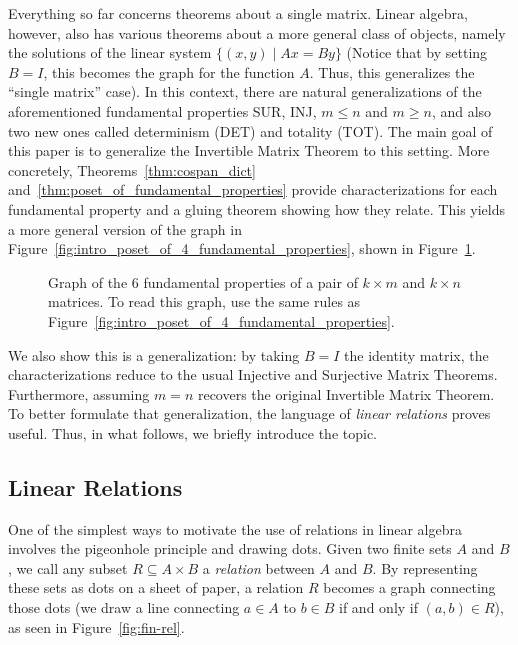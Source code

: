 \documentclass[manyauthors]{fundam}
\def\by{{\times}}
\begin{document}
Everything so far concerns theorems about a single matrix.
Linear algebra, however, also has various theorems about a more general class of objects, namely the solutions of the linear system $\{(x,y) \mid Ax = By\}$
(Notice that by setting $B = I$, this becomes the graph for the function $A$. Thus, this generalizes the ``single matrix'' case).
In this context, there are natural generalizations of the aforementioned fundamental properties SUR, INJ, $m \leq n$ and $m \geq n$, and also two new ones called determinism (DET) and totality (TOT).
The main goal of this paper is to generalize the Invertible Matrix Theorem to this setting.
More concretely, Theorems~\ref{thm:cospan_dict} and~\ref{thm:poset_of_fundamental_properties} provide characterizations for each fundamental property and a gluing theorem showing how they relate.
This yields a more general version of the graph in Figure~\ref{fig:intro_poset_of_4_fundamental_properties}, shown in Figure~\ref{fig:intro_poset_of_6_fundamental_properties}.

\begin{figure}[h]
  \centering
  \caption{Graph of the $6$ fundamental properties of a pair of $k \by m$ and $k \by n$ matrices.
  To read this graph, use the same rules as Figure~\ref{fig:intro_poset_of_4_fundamental_properties}.}
  \label{fig:intro_poset_of_6_fundamental_properties}
\end{figure}
We also show this is a generalization: by taking $B = I$ the identity matrix, the characterizations reduce to the usual Injective and Surjective Matrix Theorems.
Furthermore, assuming $m = n$ recovers the original Invertible Matrix Theorem.
To better formulate that generalization, the language of \emph{linear relations} proves useful.
Thus, in what follows, we briefly introduce the topic.

\subsection{Linear Relations}
\label{sec:pigeonhole}

One of the simplest ways to motivate the use of relations in linear algebra involves the pigeonhole principle and drawing dots. Given two finite sets $A$ and $B$, we call any subset $R \subseteq A \times B$ a \emph{relation} between $A$ and $B$.
By representing these sets as dots on a sheet of paper, a relation $R$ becomes a graph connecting those dots (we draw a line connecting $a \in A$ to $b \in B$ if and only if $(a, b) \in R$), as seen in Figure~\ref{fig:fin-rel}.
\end{document}

